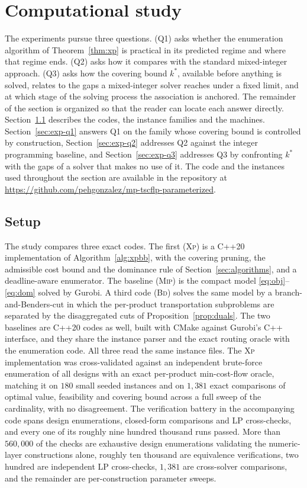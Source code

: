 \section{Computational study}
\label{sec:experiments}

The experiments pursue three questions. (Q1) asks whether the enumeration algorithm of
Theorem~\ref{thm:xp} is practical in its predicted regime and where that
regime ends. (Q2) asks how it compares with the standard mixed-integer
approach. (Q3) asks how the covering bound $k^\ast$, available before
anything is solved, relates to the gaps a mixed-integer solver reaches
under a fixed limit, and at which stage of the solving process the
association is anchored. The remainder of the section is organized so that
the reader can locate each answer directly. Section~\ref{sec:exp-setup}
describes the codes, the instance families and the machines.
Section~\ref{sec:exp-q1} answers Q1 on the family whose covering bound is
controlled by construction, Section~\ref{sec:exp-q2} addresses Q2 against
the integer programming baseline, and Section~\ref{sec:exp-q3} addresses
Q3 by
confronting $k^\ast$ with the gaps of a solver that makes no use of it.
The code and the instances used throughout the section are available in
the repository at
\url{https://github.com/pehgonzalez/mp-tscflp-parameterized}.

\subsection{Setup}
\label{sec:exp-setup}

The study compares three exact codes. The first (\textsc{Xp}) is a C++20
implementation of Algorithm~\ref{alg:xpbb}, with the covering pruning, the
admissible cost bound and the dominance rule of Section~\ref{sec:algorithms},
and a deadline-aware enumerator. The baseline (\textsc{Mip}) is the compact
model \eqref{eq:obj}--\eqref{eq:dom} solved by Gurobi. A third code
(\textsc{Bd}) solves the same model by a branch-and-Benders-cut in which the
per-product transportation subproblems are separated by the disaggregated cuts
of Proposition~\ref{prop:duals}. The two baselines are C++20 codes as
well, built with CMake against Gurobi's C++ interface, and they share
the instance parser and the exact routing oracle with the enumeration
code. All three read the same instance files.
The \textsc{Xp} implementation was cross-validated against an independent
brute-force enumeration of all designs with an exact per-product min-cost-flow
oracle, matching it on $180$ small seeded instances and on $1{,}381$ exact
comparisons of optimal value, feasibility and covering bound across a full sweep
of the cardinality, with no disagreement. The verification battery in the
accompanying code spans design enumerations, closed-form comparisons
and LP cross-checks, and every one of its roughly nine hundred
thousand runs passed. More than $560{,}000$ of the
checks are exhaustive design enumerations validating the numeric-layer
constructions alone, roughly ten thousand are equivalence
verifications, two hundred are independent LP cross-checks, $1{,}381$
are cross-solver comparisons, and the remainder are per-construction
parameter sweeps.

